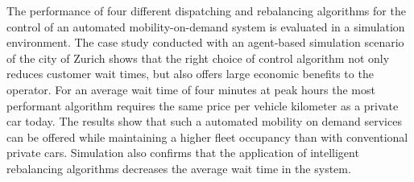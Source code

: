 The performance of four different dispatching and rebalancing algorithms for the
control of an automated mobility-on-demand system is evaluated in a simulation environment.
The case study conducted with an agent-based simulation scenario of the city of Zurich
shows that the right choice of control algorithm not only reduces customer wait
times, but also offers large economic benefits to the operator. For an average
wait time of four minutes at peak hours the most performant algorithm requires the same price
per vehicle kilometer as a private car today.
The results show that such a automated mobility on demand services can be offered
while maintaining a higher fleet occupancy than with conventional private cars. Simulation
also confirms that the application of intelligent rebalancing algorithms decreases
the average wait time in the system.
